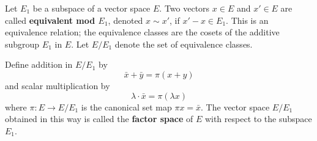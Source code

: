 Let $E_1$ be a subspace of a vector space $E$. Two vectors $x \in E$ and $x' \in E$ are called \textbf{equivalent mod $E_1$}, denoted $x \sim x'$, if $x' - x \in E_1$. This is an equivalence relation; the equivalence classes are the cosets of the additive subgroup $E_1$ in $E$. Let $E/E_1$ denote the set of equivalence classes.

Define addition in $E/E_1$ by
$$\bar{x} + \bar{y} = \pi(x + y)$$
and scalar multiplication by
$$\lambda \cdot \bar{x} = \pi(\lambda x)$$
where $\pi: E \to E/E_1$ is the canonical set map $\pi x = \bar{x}$. The vector space $E/E_1$ obtained in this way is called the \textbf{factor space} of $E$ with respect to the subspace $E_1$.
